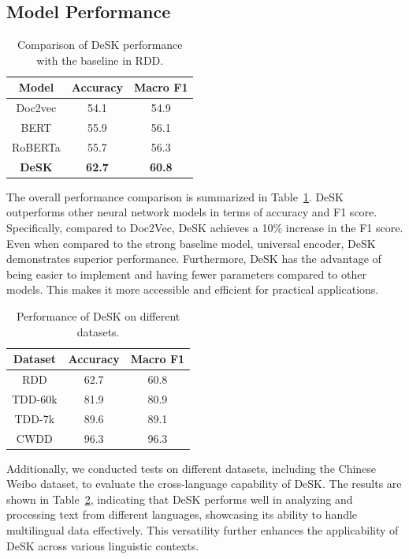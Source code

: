 \documentclass[runningheads]{llncs}
\begin{document}
\subsection{Model Performance}
\begin{table}[ht]
    \caption{Comparison of DeSK performance with the baseline in RDD.}
    \setlength{\tabcolsep}{13mm}
    \label{tab:2}
    \begin{tabular}{ccc}
    \toprule
        Model & Accuracy & Macro F1 \\ 
    \midrule
        Doc2vec & 54.1 & 54.9 \\[10pt]
        BERT & 55.9 & 56.1 \\[10pt]
        RoBERTa & 55.7 & 56.3 \\[10pt]
        \textbf{DeSK} & \textbf{62.7} & \textbf{60.8} \\[10pt]        
    \bottomrule
    \end{tabular}\par\smallskip
\end{table}



The overall performance comparison is summarized in Table~\ref{tab:2}. DeSK outperforms other neural network models in terms of accuracy and F1 score. Specifically, compared to Doc2Vec, DeSK achieves a 10\% increase in the F1 score. Even when compared to the strong baseline model, universal encoder, DeSK demonstrates superior performance. Furthermore, DeSK has the advantage of being easier to implement and having fewer parameters compared to other models. This makes it more accessible and efficient for practical applications.
\begin{table}[ht]
    \caption{Performance of DeSK on different datasets.}
    \setlength{\tabcolsep}{13.5mm}
    \label{tab:3}
    \begin{tabular}{ccc}
    \toprule
        Dataset & Accuracy & Macro F1 \\ 
    \midrule
        RDD & 62.7 & 60.8 \\[10pt]
        TDD-60k& 81.9 & 80.9 \\[10pt]
        TDD-7k & 89.6 & 89.1 \\[10pt]
        CWDD & 96.3 & 96.3 \\[10pt]
    \bottomrule
    \end{tabular}\par\smallskip
\end{table}
Additionally, we conducted tests on different datasets, including the Chinese Weibo dataset, to evaluate the cross-language capability of DeSK. The results are shown in Table~\ref{tab:3}, indicating that DeSK performs well in analyzing and processing text from different languages, showcasing its ability to handle multilingual data effectively. This versatility further enhances the applicability of DeSK across various linguistic contexts.
\end{document}
